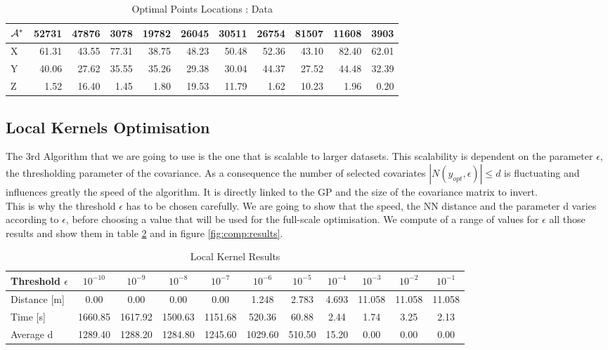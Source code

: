 \begin{table}[h]
\centering
\footnotesize
\begin{tabular}{l|rrrrrrrrrr}
\toprule
$\mathcal{A}^*$ &  52731 &  47876 &  3078  &  19782 &  26045 &  30511 &  26754 &  81507 &  11608 &  3903  \\
\midrule
X &  61.31 &  43.55 &  77.31 &  38.75 &  48.23 &  50.48 &  52.36 &  43.10 &  82.40 &  62.01 \\
Y &  40.06 &  27.62 &  35.55 &  35.26 &  29.38 &  30.04 &  44.37 &  27.52 &  44.48 &  32.39 \\
Z &   1.52 &  16.40 &   1.45 &   1.80 &  19.53 &  11.79 &   1.62 &  10.23 &   1.96 &   0.20 \\
\bottomrule
\end{tabular}
\caption{Optimal Points Locations : Data}
\label{tab:opt_small}
\end{table}

\subsection{Local Kernels Optimisation}

The 3rd Algorithm that we are going to use is the one that is scalable to larger datasets. This scalability is dependent on the parameter $\epsilon$, the thresholding parameter of the covariance. As a consequence the number of selected covariates  $|N(y_{opt},\epsilon)| \leq d $ is fluctuating and influences greatly the speed of the algorithm. It is directly linked to the GP and the size of the covariance matrix to invert.  \\ 

This is why the threshold $\epsilon$ has to be chosen carefully. We are going to show that the speed, the NN distance and the parameter d varies according to $\epsilon$, before choosing a value that will be used for the full-scale optimisation. We compute of a range of values for $\epsilon$ all those results and show them in table \ref{tab:comp:results} and in figure \ref{fig:comp:results}. \\



\begin{table}[h!]
\centering
\scriptsize
\begin{tabular}{l|c|c|c|c|c|c|c|c|c|c}
  \toprule
  Threshold $\epsilon$ & $10^{-10} $ &  $10^{-9}$ & $10^{-8}$ & $10^{-7}$ & $10^{-6}$ & $10^{-5}$ & $10^{-4}$ & $10^{-3}$ & $10^{-2}$ & $10^{-1}$ \\
    \midrule
  Distance [m]       &    0.00 &    0.00 &    0.00 &    0.00 &   1.248 &  2.783 & 4.693 & 11.058 & 11.058 & 11.058 \\
Time [s]       & 1660.85 & 1617.92 & 1500.63 & 1151.68 &  520.36 &  60.88 &  2.44 &   1.74 &   3.25 &   2.13 \\
Average d & 1289.40 & 1288.20 & 1284.80 & 1245.60 & 1029.60 & 510.50 & 15.20 &   0.00 &   0.00 &   0.00 \\
  \bottomrule
\end{tabular}
\caption{Local Kernel Results}
\label{tab:comp:results}
\end{table}

